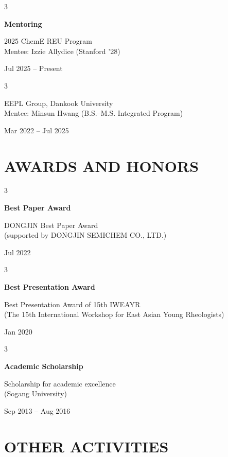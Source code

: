 \documentclass[11pt, a4paper]{article}
\newenvironment{threecolentrywide}[3][]{
    \onecolentry
    \def\thirdColumn{#3}
    \setcolumnwidth{3.5cm, \fill, 2 cm}
    \begin{paracol}{3}
    {\raggedright #2} \switchcolumn
}{
    \switchcolumn \raggedleft \thirdColumn
    \end{paracol}
    \endonecolentry
} %
\newenvironment{threecolentryteach}[3][]{
    \onecolentry
    \def\thirdColumn{#3}
    \setcolumnwidth{3.5cm, \fill, 2.5 cm}
    \begin{paracol}{3}
    {\raggedright #2} \switchcolumn
}{
    \switchcolumn \raggedleft \thirdColumn
    \end{paracol}
    \endonecolentry
} %
\begin{document}
        
        \vspace{0.3cm} 
        
        \begin{threecolentryteach}
             {\textbf{Mentoring}}
             {Jul 2025 – Present}
             {2025 ChemE REU Program\\Mentee: Izzie Allydice (Stanford '28)}
        \end{threecolentryteach}

        \vspace{0.2em}

        \begin{threecolentryteach}
             {}
             {Mar 2022 – Jul 2025}
             {EEPL Group, Dankook University\\Mentee: Minsun Hwang (B.S.–M.S. Integrated Program)}
        \end{threecolentryteach}
      


    
    \section{AWARDS AND HONORS}
        \begin{threecolentrywide}
            {\textbf{Best Paper Award}}
            {Jul 2022}
            {DONGJIN Best Paper Award\\(supported by DONGJIN SEMICHEM CO., LTD.)}
        \end{threecolentrywide}

        \vspace{0.3cm}
        
        \begin{threecolentrywide}
            {\textbf{Best Presentation Award}}
            {Jan 2020}
            {Best Presentation Award of 15th IWEAYR\\
            (The 15th International Workshop for East Asian Young Rheologists)}
        \end{threecolentrywide}

        \vspace{0.3cm}
        \begin{threecolentrywide}
            {\textbf{Academic Scholarship}}
            {Sep 2013 – Aug 2016}
            {Scholarship for academic excellence\\(Sogang University)}
        \end{threecolentrywide}


    \section{OTHER ACTIVITIES}
    
\end{document}
